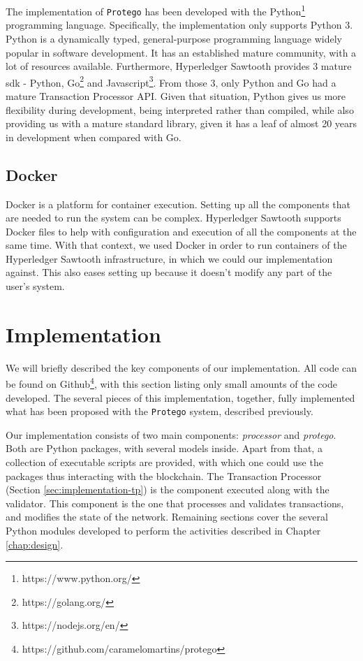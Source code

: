 The implementation of \texttt{Protego} has been developed with the Python\footnote{https://www.python.org/} programming language. Specifically, the implementation only supports Python 3. Python is a dynamically typed, general-purpose programming language widely popular in software development. It has an established mature community, with a lot of resources available. Furthermore, Hyperledger Sawtooth provides 3 mature \gls{sdk} - Python, Go\footnote{https://golang.org/} and Javascript\footnote{https://nodejs.org/en/}. From those 3, only Python and Go had a mature Transaction Processor API. Given that situation, Python gives us more flexibility during development, being interpreted rather than compiled, while also providing us with a mature standard library, given it has a leaf of almost 20 years in development when compared with Go.

\subsection{Docker}

Docker is a platform for container execution. Setting up all the components that are needed to run the system can be complex. Hyperledger Sawtooth supports Docker files to help with configuration and execution of all the components at the same time. With that context, we used Docker in order to run containers of the Hyperledger Sawtooth infrastructure, in which we could our implementation against. This also eases setting up because it doesn't modify any part of the user's system.

\section{Implementation}
\label{sec:implementation-core}

We will briefly described the key components of our implementation. All code can be found on Github\footnote{https://github.com/caramelomartins/protego}, with this section listing only small amounts of the code developed. The several pieces of this implementation, together, fully implemented what has been proposed with the  \texttt{Protego} system, described previously.

Our implementation consists of two main components: \textit{processor} and \textit{protego}. Both are Python packages, with several models inside. Apart from that, a collection of executable scripts are provided, with which one could use the packages thus interacting with the blockchain. The Transaction Processor (Section \ref{sec:implementation-tp}) is the component executed along with the validator. This component is the one that processes and validates transactions, and modifies the state of the network. Remaining sections cover the several Python modules developed to perform the activities described in Chapter \ref{chap:design}.


